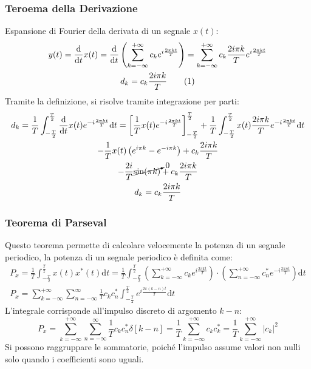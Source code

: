 \documentclass{article}
\newcommand{\df}{\mathrm{d}}
\newcommand{\tageq}{\tag{\stepcounter{equation}\theequation}}
\numberwithin{equation}{subsection}
\begin{document}
\subsubsection{Teroema della Derivazione}

Espansione di Fourier della derivata di un segnale $x(t)$:
\begin{gather*}
    y(t)=\displaystyle\frac{\df}{\df t}x(t)=\frac{\df}{\df t}\left(\displaystyle\sum_{k=-\infty}^{+\infty}c_ke^{i\frac{2\pi kt}{T}}\right)=\sum_{k=-\infty}^{+\infty}c_k\frac{2i\pi k}{T}e^{i\frac{2\pi kt}{T}}\\
    d_k=c_k\displaystyle\frac{2i\pi k}{T}\tageq
\end{gather*}
Tramite la definizione, si risolve tramite integrazione per parti:
\begin{gather*}
    d_k=\displaystyle\frac{1}{T}\int_{-\frac{T}{2}}^{\frac{T}{2}}\frac{\df}{\df t}x(t)e^{-i\frac{2\pi kt}{T}}\df t=
    \left[\frac{1}{T}x(t)e^{-i\frac{2\pi kt}{T}}\right]_{-\frac{T}{2}}^{\frac{T}{2}}+\frac{1}{T}\int_{-\frac{T}{2}}^{\frac{T}{2}}x(t)\frac{2i\pi k}{T}e^{-i\frac{2\pi kt}{T}}\df t\\
    \displaystyle-\frac{1}{T}x(t)\left(e^{i\pi k}-e^{-i\pi k}\right)+c_k\frac{2i\pi k}{T}\\
    \displaystyle-\frac{2i}{T}\cancelto{0}{\sin(\pi k)}+c_k\frac{2i\pi k}{T}\\
    d_k=c_k\displaystyle\frac{2i\pi k}{T}
\end{gather*}

\subsubsection{Teorema di Parseval}

Questo teorema permette di calcolare velocemente la potenza di un segnale periodico, la potenza di un segnale periodico è definita come:
\begin{gather*}
    P_x=\displaystyle\frac{1}{T}\int_{-\frac{T}{2}}^{\frac{T}{2}}x(t)x^*(t)\df t=
    \frac{1}{T}\int_{-\frac{T}{2}}^{\frac{T}{2}}\left(\sum_{k=-\infty}^{+\infty}c_ke^{i\frac{2\pi kt}{T}}\right)\cdot\left(
    \sum_{n=-\infty}^{+\infty}c_n^*e^{-i\frac{2\pi nt}{T}}\right)\df t\\
    P_x=\displaystyle\sum_{k=-\infty}^{+\infty}\sum_{n=-\infty}^{\infty}\frac{1}{T}c_kc^*_n\int_{-\frac{T}{2}}^{\frac{T}{2}}e^{i\frac{2\pi (k-n)t}{T}}\df t
\end{gather*}
L'integrale corrisponde all'impulso discreto di argomento $k-n$:
\begin{equation}
    P_x=\displaystyle\sum_{k=-\infty}^{+\infty}\sum_{n=-\infty}^{\infty}\frac{1}{T}c_kc_n^*\delta[k-n]=\frac{1}{T}\sum_{k=-\infty}^{+\infty}c_kc_k^*=\frac{1}{T}\sum_{k=-\infty}^{+\infty}|c_k|^2
\end{equation}
Si possono raggruppare le sommatorie, poiché l'impulso assume valori non nulli solo quando i coefficienti sono uguali. 
\end{document}
